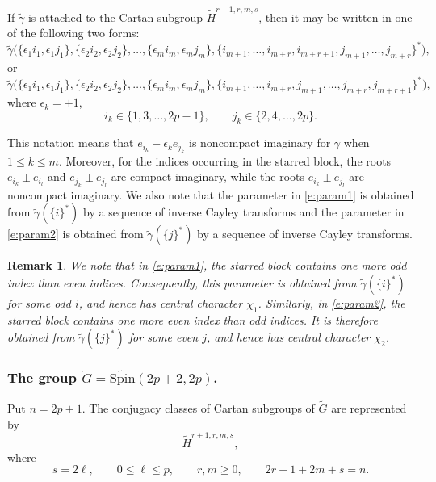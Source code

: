 \documentclass{amsart}
\newcommand{\Spin}{{\mathrm{Spin}}}
\newtheorem{remark}[thm]{Remark}
\theoremstyle{definition}
\newcommand{\tu}{\widetilde}
\begin{document}
If $\tu \gamma$ is attached to the Cartan subgroup $\widetilde H^{r+1,r,m,s}$, then it may be written in one of the following two forms:
\begin{equation} \label{e:param1}
\tu\gamma\bigl(
\{\epsilon_1 i_1,\epsilon_1 j_1\},
\{\epsilon_2 i_2,\epsilon_2 j_2\},
\ldots,
\{\epsilon_m i_m,\epsilon_m j_m\},
\{i_{m+1},\ldots,i_{m+r},i_{m+r+1},
j_{m+1},\ldots,j_{m+r}\}^*
\bigr),
\end{equation}
or
\begin{equation}\label{e:param2}
\tu\gamma\bigl(
\{\epsilon_1 i_1,\epsilon_1 j_1\},
\{\epsilon_2 i_2,\epsilon_2 j_2\},
\ldots,
\{\epsilon_m i_m,\epsilon_m j_m\},\{i_{m+1},\ldots,i_{m+r},
j_{m+1},\ldots,j_{m+r},j_{m+r+1}\}^*
\bigr),
\end{equation}
where $\epsilon_k=\pm 1$,
\begin{equation*}
i_k\in\{1,3,\ldots,2p-1\},
\qquad
j_k\in\{2,4,\ldots,2p\}.
\end{equation*}



This notation means that $e_{i_k}-\epsilon_k e_{j_k}$ is noncompact imaginary for $\gamma$ when $1\leq k\leq m$. Moreover, for the indices occurring in the starred block, the roots $e_{i_k}\pm e_{i_l}$ and $e_{j_k}\pm e_{j_l}$ are compact imaginary, while the roots $e_{i_k}\pm e_{j_l}$ are noncompact imaginary. We also note that the parameter in \eqref{e:param1} is obtained from $\tu\gamma(\{i\}^*)$ by a sequence of inverse Cayley transforms and the parameter in  \eqref{e:param2} is obtained from $\tu\gamma(\{j\}^*)$ by a sequence of inverse Cayley transforms.

\begin{remark}
    We note that
in \eqref{e:param1}, the starred block contains one more odd index
than even indices. Consequently, this parameter is obtained from
\(\widetilde\gamma(\{i\}^*)\) for some odd \(i\), and hence has
central character \(\chi_1\). Similarly, in \eqref{e:param2}, the starred block contains one more
even index than odd indices. It is therefore obtained from
\(\widetilde\gamma(\{j\}^*)\) for some even \(j\), and hence has
central character \(\chi_2\).
\end{remark}

\subsubsection{The group
\(\widetilde G=\widetilde{\Spin}(2p+2,2p)\).}

Put \(n=2p+1\). The conjugacy classes of Cartan subgroups of
\(\widetilde G\) are represented by
\[
\widetilde H^{r+1,r,m,s},
\]
where
\[
s=2\ell,\qquad 0\leq \ell\leq p,
\qquad r,m\geq0,
\qquad
2r+1+2m+s=n.
\]
\end{document}
